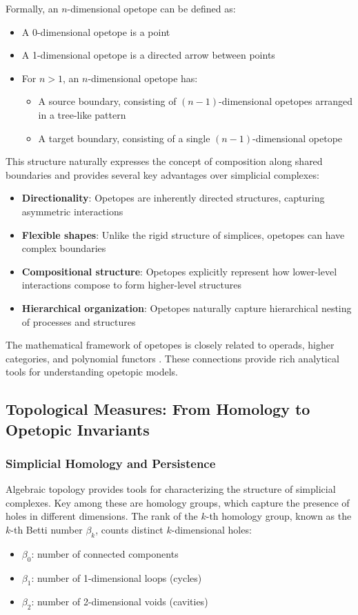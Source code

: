 Formally, an $n$-dimensional opetope can be defined as:
\begin{itemize}
    \item A 0-dimensional opetope is a point
    \item A 1-dimensional opetope is a directed arrow between points
    \item For $n>1$, an $n$-dimensional opetope has:
    \begin{itemize}
        \item A source boundary, consisting of $(n-1)$-dimensional opetopes arranged in a tree-like pattern
        \item A target boundary, consisting of a single $(n-1)$-dimensional opetope
    \end{itemize}
\end{itemize}

This structure naturally expresses the concept of composition along shared boundaries and provides several key advantages over simplicial complexes:

\begin{itemize}
    \item \textbf{Directionality}: Opetopes are inherently directed structures, capturing asymmetric interactions
    \item \textbf{Flexible shapes}: Unlike the rigid structure of simplices, opetopes can have complex boundaries
    \item \textbf{Compositional structure}: Opetopes explicitly represent how lower-level interactions compose to form higher-level structures
    \item \textbf{Hierarchical organization}: Opetopes naturally capture hierarchical nesting of processes and structures
\end{itemize}

The mathematical framework of opetopes is closely related to operads, higher categories, and polynomial functors \citep{baez2020network, leinster2004higher}. These connections provide rich analytical tools for understanding opetopic models.

\subsection{Topological Measures: From Homology to Opetopic Invariants}
\subsubsection{Simplicial Homology and Persistence}
Algebraic topology provides tools for characterizing the structure of simplicial complexes. Key among these are homology groups, which capture the presence of holes in different dimensions. The rank of the $k$-th homology group, known as the $k$-th Betti number $\beta_k$, counts distinct $k$-dimensional holes:
\begin{itemize}
    \item $\beta_0$: number of connected components
    \item $\beta_1$: number of 1-dimensional loops (cycles)
    \item $\beta_2$: number of 2-dimensional voids (cavities)
\end{itemize}

